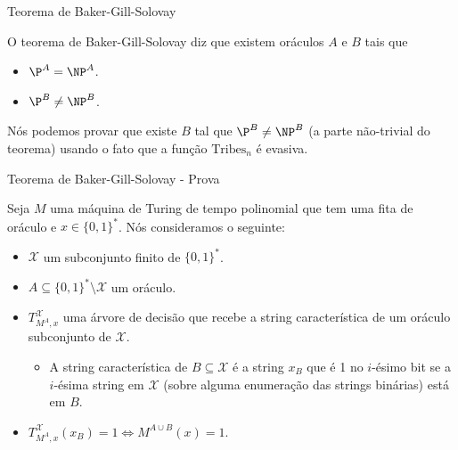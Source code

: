 \documentclass[landscape]{beamer}
\newcommand{\binalph}{\{0, 1\}}
\newcommand{\Tribes}{\text{Tribes}}
\begin{document}

\begin{frame} {Teorema de Baker-Gill-Solovay}

O teorema de Baker-Gill-Solovay diz que existem oráculos $A$ e $B$ tais que

\begin{itemize}

	\item $\P^{A} = \NP^{A}$.
	
	\item $\P^{B} \neq \NP^{B}$.

\end{itemize}

Nós podemos provar que existe $B$ tal que $\P^{B} \neq \NP^{B}$ (a parte não-trivial do teorema) usando o fato que a função $\Tribes_{n}$ é evasiva.

\end{frame}


\begin{frame} {Teorema de Baker-Gill-Solovay - Prova}

Seja $M$ uma máquina de Turing de tempo polinomial que tem uma fita de oráculo e $x \in \binalph^{*}$. Nós consideramos o seguinte:

\begin{itemize}

	\item $\mathcal{X}$ um subconjunto finito de $\binalph^{*}$.
	
	\item $A \subseteq \binalph^{*} \setminus \mathcal{X}$ um oráculo.
	
	\item $T_{M^{A}, x}^{\mathcal{X}}$ uma árvore de decisão que recebe a string característica de um oráculo subconjunto de $\mathcal{X}$.
	
	\begin{itemize}
	
		\item A string característica de $B \subseteq \mathcal{X}$ é a string $x_{B}$ que é 1 no $i$-ésimo bit se a $i$-ésima string em $\mathcal{X}$ (sobre alguma enumeração das strings binárias) está em $B$.
	
	\end{itemize}
	
	\item $T_{M^{A}, x}^{\mathcal{X}}(x_{B}) = 1 \iff M^{A \cup B}(x) = 1$.

\end{itemize}

\end{frame}
\end{document}
